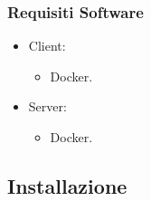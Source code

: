 \subsubsection{Requisiti Software}
\begin{itemize}
	\item Client:
\begin{itemize}
	\item Docker.
	
\end{itemize}
	\item Server:
\begin{itemize}
	\item Docker.
	
\end{itemize}
\end{itemize}







\subsection{Installazione}



